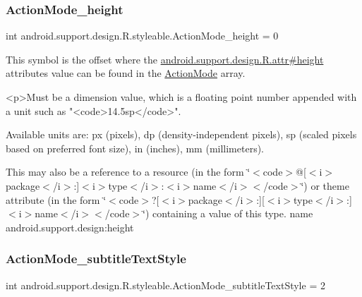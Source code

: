 \subsubsection{\texorpdfstring{Action\+Mode\+\_\+height}{ActionMode\_height}}
{\footnotesize\ttfamily int android.\+support.\+design.\+R.\+styleable.\+Action\+Mode\+\_\+height = 0\hspace{0.3cm}{\ttfamily [static]}}

This symbol is the offset where the \hyperlink{classandroid_1_1support_1_1design_1_1R_1_1attr_a9f0ba1ff755eae97d0aaf956a1f3438b}{android.\+support.\+design.\+R.\+attr\#height} attribute\textquotesingle{}s value can be found in the \hyperlink{classandroid_1_1support_1_1design_1_1R_1_1styleable_aece7cc3345738baf4a59955f870e1507}{Action\+Mode} array.

\begin{DoxyVerb}      <p>Must be a dimension value, which is a floating point number appended with a unit such as "<code>14.5sp</code>".
\end{DoxyVerb}
 Available units are\+: px (pixels), dp (density-\/independent pixels), sp (scaled pixels based on preferred font size), in (inches), mm (millimeters). 

This may also be a reference to a resource (in the form \char`\"{}$<$code$>$@\mbox{[}$<$i$>$package$<$/i$>$\+:\mbox{]}$<$i$>$type$<$/i$>$\+:$<$i$>$name$<$/i$>$$<$/code$>$\char`\"{}) or theme attribute (in the form \char`\"{}$<$code$>$?\mbox{[}$<$i$>$package$<$/i$>$\+:\mbox{]}\mbox{[}$<$i$>$type$<$/i$>$\+:\mbox{]}$<$i$>$name$<$/i$>$$<$/code$>$\char`\"{}) containing a value of this type.  name android.\+support.\+design\+:height \mbox{\label{classandroid_1_1support_1_1design_1_1R_1_1styleable_ab020e22226101744be54397777af6d46}} 
\subsubsection{\texorpdfstring{Action\+Mode\+\_\+subtitle\+Text\+Style}{ActionMode\_subtitleTextStyle}}
{\footnotesize\ttfamily int android.\+support.\+design.\+R.\+styleable.\+Action\+Mode\+\_\+subtitle\+Text\+Style = 2\hspace{0.3cm}{\ttfamily [static]}}

